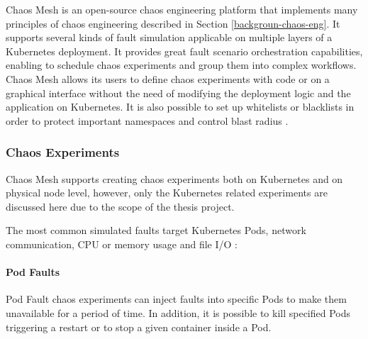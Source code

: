 Chaos Mesh is an open-source chaos engineering platform that implements many principles of chaos engineering described in Section \ref{backgroun-chaos-eng}. It supports several kinds of fault simulation applicable on multiple layers of a Kubernetes deployment. It provides great fault scenario orchestration capabilities, enabling to schedule chaos experiments and group them into complex workflows. Chaos Mesh allows its users to define chaos experiments with code or on a graphical interface without the need of modifying the deployment logic and the application on Kubernetes. It is also possible to set up whitelists or blacklists in order to protect important namespaces and control blast radius \cite{ChaosMesh}. 

%	

\subsubsection{Chaos Experiments}

Chaos Mesh supports creating chaos experiments both on Kubernetes and on physical node level, however, only the Kubernetes related experiments are discussed here due to the scope of the thesis project.

The most common simulated faults target Kubernetes Pods, network communication, CPU or memory usage and file I/O \cite{ChaosMesh}:

\paragraph{Pod Faults} Pod Fault chaos experiments can inject faults into specific Pods to make them unavailable for a period of time. In addition, it is possible to kill specified Pods triggering a restart or to stop a given container inside a Pod.

